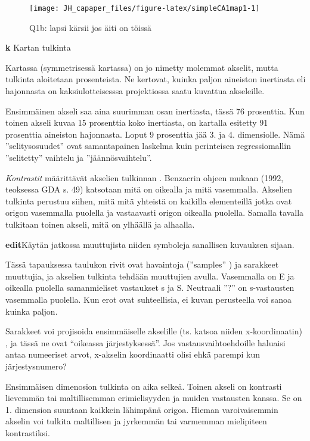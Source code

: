 \documentclass[
  finnish,
]{book}
\begin{document}
\begin{figure}

{\centering \texttt{[image: JH\_capaper\_files/figure-latex/simpleCA1map1-1]} 

}

\caption{Q1b: lapsi kärsii jos äiti on töissä}\label{fig:simpleCA1map1}
\end{figure}

\textbf{k} Kartan tulkinta

Kartassa (symmetrisessä kartassa) on jo nimetty molemmat akselit, mutta tulkinta
aloitetaan prosenteista. Ne kertovat, kuinka paljon aineiston inertiasta eli
hajonnasta on kaksiulotteisesssa projektiossa saatu kuvattua akseleille.

Ensimmäinen akseli saa aina suurimman osan inertiasta, tässä 76 prosenttia.
Kun toinen akseli kuvaa 15 prosenttia koko inertiasta, on kartalla esitetty 91
prosenttia aineiston hajonnasta. Loput 9 prosenttia jää 3. ja 4. dimensiolle.
Nämä ''selitysosuudet'' ovat samantapainen laskelma kuin perinteisen regressiomallin
''selitetty'' vaihtelu ja ''jäännösvaihtelu''.

\emph{Kontrastit} määrittävät akselien tulkinnan . Benzacrin ohjeen mukaan (1992,
teoksessa GDA s. 49) katsotaan mitä on oikealla ja mitä vasemmalla. Akselien
tulkinta perustuu siihen, mitä mitä yhteistä on kaikilla elementeillä jotka ovat
origon vasemmalla puolella ja vastaavasti origon oikealla puolella. Samalla tavalla
tulkitaan toinen akseli, mitä on ylhäällä ja alhaalla.

\textbf{edit}Käytän jatkossa muuttujista niiden symboleja sanallisen kuvauksen sijaan.

Tässä tapauksessa taulukon rivit ovat havaintoja (''samples'' ) ja sarakkeet
muuttujia, ja akselien tulkinta tehdään muuttujien avulla. Vasemmalla on E ja
oikealla puolella samanmieliset vastaukset s ja S. Neutraali ''?'' on s-vastausten
vasemmalla puolella. Kun erot ovat suhteellisia, ei kuvan perusteella voi sanoa
kuinka paljon.

Sarakkeet voi projisoida ensimmäiselle akselille (ts. katsoa niiden x-koordinaatin)
, ja tässä ne ovat ``oikeassa järjestyksessä''.
Jos vastausvaihtoehdoille haluaisi antaa numeeriset arvot, x-akselin koordinaatti
olisi ehkä parempi kun järjestysnumero?

Ensimmäisen dimenosion tulkinta on aika selkeä. Toinen akseli on kontrasti
lievemmän tai maltillisemman erimielisyyden ja muiden vastausten kanssa.
Se on 1. dimension suuntaan kaikkein lähimpänä origoa. Hieman varoivaisemmin
akselin voi tulkita maltillisen ja jyrkemmän tai varmemman mielipiteen kontrastiksi.
\end{document}
